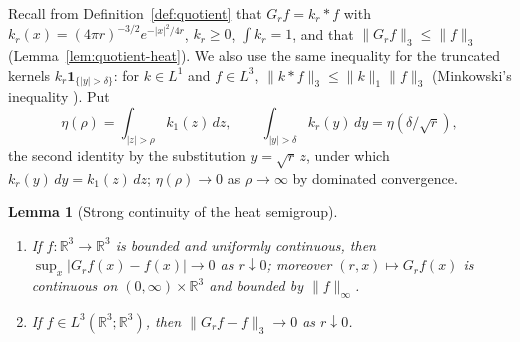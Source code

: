 \documentclass[11pt]{article}
\newtheorem{lemma}[theorem]{Lemma}
\theoremstyle{definition}
\theoremstyle{plain}
\newcommand{\R}{\mathbb R}
\newcommand{\norm}[1]{\lVert #1\rVert}
\begin{document}
Recall from Definition~\ref{def:quotient} that $G_rf=k_r*f$ with
$k_r(x)=(4\pi r)^{-3/2}e^{-|x|^2/4r}$, $k_r\ge0$, $\int k_r=1$, and that
$\norm{G_rf}_3\le\norm f_3$ (Lemma~\ref{lem:quotient-heat}).  We also use
the same inequality for the truncated kernels
$k_r\mathbf 1_{\{|y|>\delta\}}$: for $k\in L^1$ and $f\in L^3$,
$\norm{k*f}_3\le\norm k_1\norm f_3$ (Minkowski's inequality
\cite[Thm.~1.2.10]{Grafakos2014}).  Put
\begin{equation}\label{eq:qe-eta}
 \eta(\rho)=\int_{|z|>\rho}k_1(z)\,dz,
 \qquad
 \int_{|y|>\delta}k_r(y)\,dy=\eta(\delta/\sqrt r),
\end{equation}
the second identity by the substitution $y=\sqrt r\,z$, under which
$k_r(y)\,dy=k_1(z)\,dz$; $\eta(\rho)\to0$ as $\rho\to\infty$ by dominated
convergence.

\begin{lemma}[Strong continuity of the heat semigroup]
\label{lem:qe-heat-continuity}\leavevmode
\begin{enumerate}
\item[(a)] If $f:\R^3\to\R^3$ is bounded and uniformly continuous, then
 $\sup_x|G_rf(x)-f(x)|\to0$ as $r\downarrow0$; moreover
 $(r,x)\mapsto G_rf(x)$ is continuous on $(0,\infty)\times\R^3$ and bounded
 by $\norm f_\infty$.
\item[(b)] If $f\in L^3(\R^3;\R^3)$, then $\norm{G_rf-f}_3\to0$ as
 $r\downarrow0$.
\end{enumerate}
\end{lemma}
\end{document}

